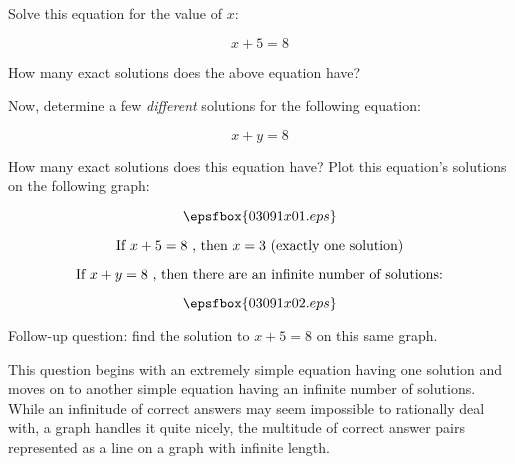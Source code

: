 

Solve this equation for the value of $x$:

$$x + 5 = 8$$

How many exact solutions does the above equation have?

\vskip 20pt

Now, determine a few {\it different} solutions for the following equation:

$$x + y = 8$$

How many exact solutions does this equation have?  Plot this equation's solutions on the following graph:

$$\epsfbox{03091x01.eps}$$







$$\hbox{If } x + 5 = 8 \hbox{ , then } x = 3 \hbox{ (exactly one solution)}$$

$$\hbox{If } x + y = 8 \hbox{ , then there are an infinite number of solutions:}$$

$$\epsfbox{03091x02.eps}$$

\vskip 10pt

Follow-up question: find the solution to $x + 5 = 8$ on this same graph.







This question begins with an extremely simple equation having one solution and moves on to another simple equation having an infinite number of solutions.  While an infinitude of correct answers may seem impossible to rationally deal with, a graph handles it quite nicely, the multitude of correct answer pairs represented as a line on a graph with infinite length.




